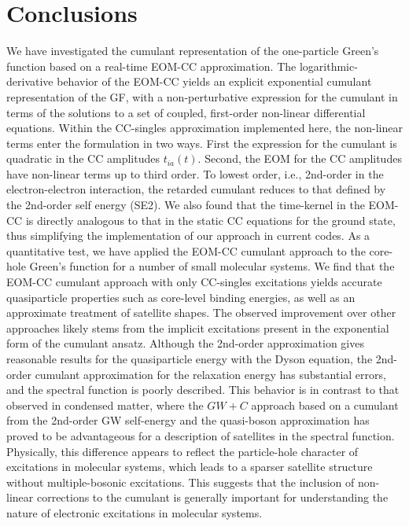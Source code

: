 \documentclass[aps,prb,twocolumn,groupaddress,floatfix]{revtex4}
\begin{document}
\section{Conclusions}

We have investigated the cumulant representation of the one-particle Green's
function based on a real-time EOM-CC approximation. The logarithmic-derivative
behavior of the EOM-CC yields an explicit exponential cumulant representation of
the GF, with a non-perturbative expression for the cumulant in terms of the
solutions to a set of  coupled, first-order non-linear differential equations.
Within the CC-singles approximation implemented here, the non-linear terms enter
the formulation in two ways. First the expression for the cumulant is quadratic
in the CC amplitudes $t_{ia}(t)$. Second, the EOM for the CC amplitudes have
non-linear terms up to third order. To lowest order, i.e., 2nd-order in the
electron-electron interaction, the retarded cumulant reduces to that defined by
the 2nd-order self energy (SE2). We also found that the time-kernel in the
EOM-CC is directly analogous to that in the static CC equations for the ground
state, thus simplifying the implementation of our approach in current codes. As
a quantitative test, we have applied the EOM-CC cumulant approach to the
core-hole Green's function for a number of small molecular systems. We find that
the EOM-CC cumulant approach with only CC-singles excitations yields accurate
quasiparticle properties such as core-level binding energies, as well as an
approximate treatment of satellite shapes. The observed improvement over other
approaches likely stems from the implicit excitations present in the exponential
form of the cumulant ansatz. Although the 2nd-order approximation gives
reasonable results for the quasiparticle energy with the Dyson equation, the
2nd-order cumulant approximation for the relaxation energy has substantial
errors, and the spectral function is poorly described. This behavior is in
contrast to that observed in condensed matter, where the $GW+C$
approach\cite{sky,PhysRevLett.110.146801,PhysRevB.94.035103} based on a cumulant
from the 2nd-order GW self-energy and the quasi-boson approximation has proved
to be advantageous for a description of satellites in the spectral
function.\cite{Hedin99review,sky} Physically, this difference appears to reflect
the particle-hole character of excitations in molecular systems, which leads to
a sparser satellite structure without multiple-bosonic
excitations.\cite{marilena20} This suggests that the inclusion of non-linear
corrections to the cumulant is generally important for understanding the nature
of electronic excitations in molecular systems.
\end{document}
